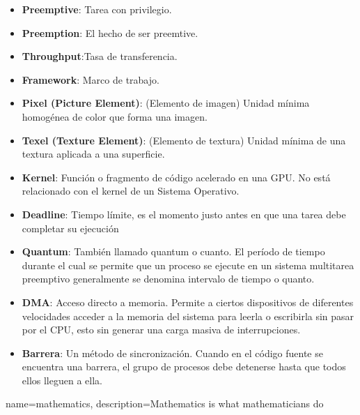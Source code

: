 \begin{itemize}
\item \textbf{Preemptive}: Tarea con privilegio.
\item \textbf{Preemption}: El hecho de ser preemtive.
\item \textbf{Throughput}:Tasa de transferencia.
\item \textbf{Framework}: Marco de trabajo.
\item \textbf{Pixel (Picture Element)}: (Elemento de imagen) Unidad mínima homogénea de color que forma una imagen.
\item \textbf{Texel (Texture Element)}: (Elemento de textura)  Unidad mínima de una textura aplicada a una superficie.
\item \textbf{Kernel}: Función o fragmento de código acelerado en una GPU. No está relacionado con el kernel de un Sistema Operativo.

\item \textbf{Deadline}: Tiempo límite, es el momento justo antes en que una tarea debe completar su ejecución

\item \textbf{Quantum}: También llamado quantum o cuanto. El período de tiempo durante el cual se permite que un proceso se ejecute en un sistema multitarea preemptivo generalmente se denomina intervalo de tiempo o quanto.


\item \textbf{DMA}: Acceso directo a memoria. Permite a ciertos dispositivos de diferentes velocidades acceder a la memoria del sistema para leerla o escribirla sin pasar por el CPU, esto sin generar una carga masiva de interrupciones.

\item \textbf{Barrera}: Un método de sincronización. Cuando en el código fuente se encuentra una barrera, el grupo de procesos debe detenerse hasta que todos ellos lleguen a ella.


\end{itemize}  
{
   name=mathematics,
    description={Mathematics is what mathematicians do}
}